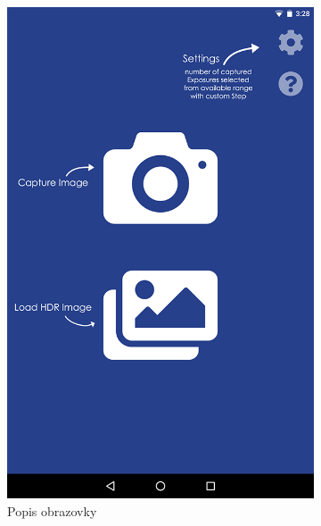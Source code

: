 \begin{figure}[h!]
    \centering
    \begin{subfigure}{0.35\textwidth}
        \includegraphics[width=\textwidth]{figures/ui/home/screenHome}
        \caption{Popis obrazovky}
        \label{fig:homeScreen_hints}
    \end{subfigure}
    ~
    \begin{subfigure}{0.35\textwidth}

\end{subfigure}
\end{figure}
